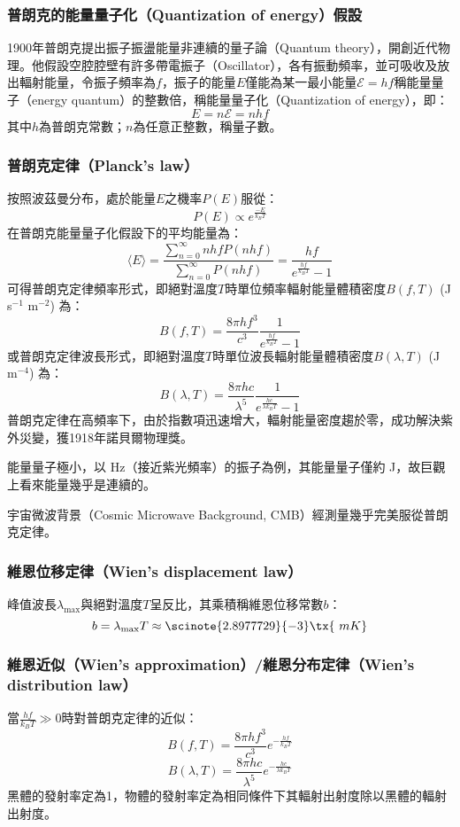 \documentclass[a4paper,12pt]{article}
\begin{document}
\subsubsection{普朗克的能量量子化（Quantization of energy）假設}
1900年普朗克提出振子振盪能量非連續的量子論（Quantum theory），開創近代物理。他假設空腔腔壁有許多帶電振子（Oscillator），各有振動頻率，並可吸收及放出輻射能量，令振子頻率為$f$，振子的能量$E$僅能為某一最小能量$\mathcal{E}=hf$稱能量量子（energy quantum）的整數倍，稱能量量子化（Quantization of energy），即：
\[E=n\mathcal{E}=nhf\]
其中$h$為普朗克常數；$n$為任意正整數，稱量子數。
\subsubsection{普朗克定律（Planck's law）}
按照波茲曼分布，處於能量$E$之機率$P(E)$服從：
\[P(E)\propto e^{\frac{-E}{k_BT}}\]
在普朗克能量量子化假設下的平均能量為：
\[\langle E\rangle=\frac{\sum_{n=0}^{\infty}nhfP(nhf)}{\sum_{n=0}^{\infty}P(nhf)}=\frac{hf}{e^{\frac{hf}{k_BT}}-1}\]
可得普朗克定律頻率形式，即絕對溫度$T$時單位頻率輻射能量體積密度$B(f,T)$ (J s$^{-1}$ m$^{-2}$) 為：
\[B(f,T)=\frac{8\pi hf^3}{c^3}\frac{1}{e^{\frac{hf}{k_BT}}-1}\]
或普朗克定律波長形式，即絕對溫度$T$時單位波長輻射能量體積密度$B(\lambda,T)$ (J m$^{-4}$) 為：
\[B(\lambda,T)=\frac{8\pi hc}{\lambda^5}\frac{1}{e^{\frac{hc}{\lambda k_BT}}-1}\]
普朗克定律在高頻率下，由於指數項迅速增大，輻射能量密度趨於零，成功解決紫外災變，獲1918年諾貝爾物理獎。

能量量子極小，以 Hz（接近紫光頻率）的振子為例，其能量量子僅約 J，故巨觀上看來能量幾乎是連續的。

宇宙微波背景（Cosmic Microwave Background, CMB）經測量幾乎完美服從普朗克定律。
\subsubsection{維恩位移定律（Wien's displacement law）}
峰值波長$\lambda_{\max}$與絕對溫度$T$呈反比，其乘積稱維恩位移常數$b$：
\[b=\lambda_{\max} T \approx \scinote{2.8977729}{-3} \tx{\ m K}\]
\subsubsection{維恩近似（Wien's approximation）/維恩分布定律（Wien's distribution law）}
當$\frac{hf}{k_BT}\gg 0$時對普朗克定律的近似：
\[B(f,T)=\frac{8\pi hf^3}{c^3}e^{-\frac{hf}{k_BT}}\]
\[B(\lambda,T)=\frac{8\pi hc}{\lambda^5}e^{-\frac{hc}{\lambda k_BT}}\]
黑體的發射率定為1，物體的發射率定為相同條件下其輻射出射度除以黑體的輻射出射度。
\end{document}
